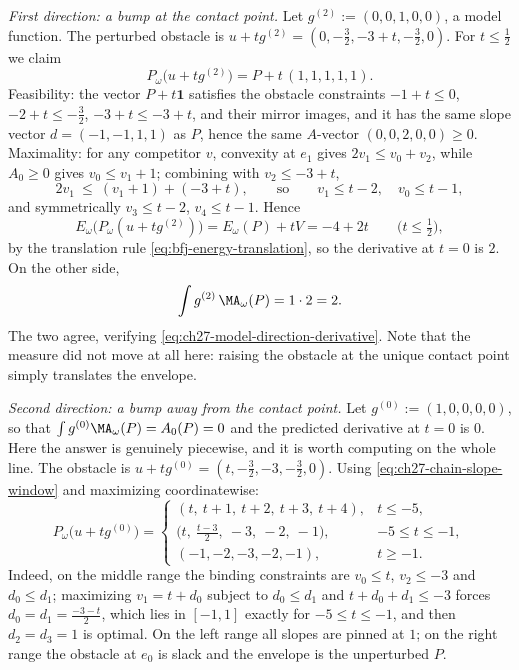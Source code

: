 \begin{example}
\emph{First direction: a bump at the contact point.}  Let
\(g^{(2)}:=(0,0,1,0,0)\), a model function.  The perturbed obstacle is
\(u+tg^{(2)}=(0,-\tfrac32,-3+t,-\tfrac32,0)\).  For \(t\leq\tfrac12\) we
claim
\[
 P_\omega\bigl(u+tg^{(2)}\bigr)=P+t\,(1,1,1,1,1).
\]
Feasibility: the vector \(P+t\mathbf 1\) satisfies the obstacle constraints
\(-1+t\leq0\), \(-2+t\leq-\tfrac32\), \(-3+t\leq-3+t\), and their mirror
images, and it has the same slope vector \(d=(-1,-1,1,1)\) as \(P\), hence
the same \(A\)-vector \((0,0,2,0,0)\geq0\).  Maximality: for any competitor
\(v\), convexity at \(e_1\) gives \(2v_1\leq v_0+v_2\), while \(A_0\geq0\)
gives \(v_0\leq v_1+1\); combining with \(v_2\leq-3+t\),
\[
 2v_1\ \leq\ (v_1+1)+(-3+t),
 \qquad\text{so}\qquad v_1\leq t-2,\quad v_0\leq t-1,
\]
and symmetrically \(v_3\leq t-2\), \(v_4\leq t-1\).  Hence
\[
 E_\omega\bigl(P_\omega(u+tg^{(2)})\bigr)
 =E_\omega(P)+tV=-4+2t
 \qquad\bigl(t\leq\tfrac12\bigr),
\]
by the translation rule \eqref{eq:bfj-energy-translation}, so the derivative
at \(t=0\) is \(2\).  On the other side,
\[
 \int g^{(2)}\,\MA_\omega(P)=1\cdot2=2 .
\]
The two agree, verifying
\eqref{eq:ch27-model-direction-derivative}.  Note that the measure did not
move at all here: raising the obstacle at the unique contact point simply
translates the envelope.

\emph{Second direction: a bump away from the contact point.}  Let
\(g^{(0)}:=(1,0,0,0,0)\), so that \(\int g^{(0)}\MA_\omega(P)=A_0(P)=0\) and
the predicted derivative at \(t=0\) is \(0\).  Here the answer is genuinely
piecewise, and it is worth computing on the whole line.  The obstacle is
\(u+tg^{(0)}=(t,-\tfrac32,-3,-\tfrac32,0)\).  Using
\eqref{eq:ch27-chain-slope-window} and maximizing coordinatewise:
\[
 P_\omega\bigl(u+tg^{(0)}\bigr)
 =\begin{cases}
   (t,\ t+1,\ t+2,\ t+3,\ t+4), & t\leq-5,\\[2pt]
   \bigl(t,\ \tfrac{t-3}2,\ -3,\ -2,\ -1\bigr), & -5\leq t\leq-1,\\[2pt]
   (-1,-2,-3,-2,-1), & t\geq-1 .
  \end{cases}
\]
Indeed, on the middle range the binding constraints are \(v_0\leq t\),
\(v_2\leq-3\) and \(d_0\leq d_1\); maximizing \(v_1=t+d_0\) subject to
\(d_0\leq d_1\) and \(t+d_0+d_1\leq-3\) forces
\(d_0=d_1=\tfrac{-3-t}2\), which lies in \([-1,1]\) exactly for
\(-5\leq t\leq-1\), and then \(d_2=d_3=1\) is optimal.  On the left range all
slopes are pinned at \(1\); on the right range the obstacle at \(e_0\) is
slack and the envelope is the unperturbed \(P\).


\end{example}

